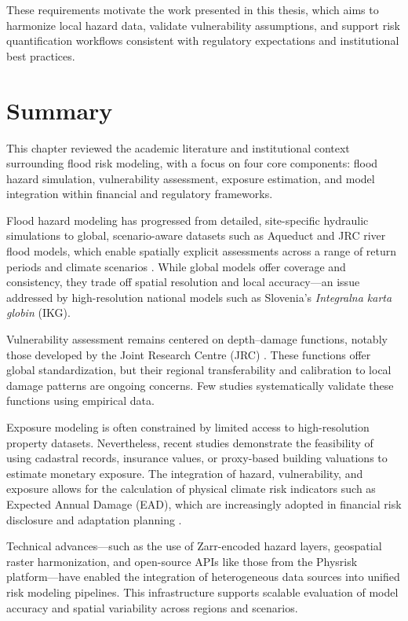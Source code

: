 These requirements motivate the work presented in this thesis, which aims to harmonize local hazard data, validate vulnerability assumptions, and support risk quantification workflows consistent with regulatory expectations and institutional best practices.

\section{Summary}

This chapter reviewed the academic literature and institutional context surrounding flood risk modeling, with a focus on four core components: flood hazard simulation, vulnerability assessment, exposure estimation, and model integration within financial and regulatory frameworks.

Flood hazard modeling has progressed from detailed, site-specific hydraulic simulations to global, scenario-aware datasets such as Aqueduct and JRC river flood models, which enable spatially explicit assessments across a range of return periods and climate scenarios \cite{ward_assessing_2013, ward_aqueduct_2020, baugh_river_2024}. While global models offer coverage and consistency, they trade off spatial resolution and local accuracy—an issue addressed by high-resolution national models such as Slovenia's \textit{Integralna karta globin} (IKG).

Vulnerability assessment remains centered on depth--damage functions, notably those developed by the Joint Research Centre (JRC) \cite{huizinga_global_2017}. These functions offer global standardization, but their regional transferability and calibration to local damage patterns are ongoing concerns. Few studies systematically validate these functions using empirical data.

Exposure modeling is often constrained by limited access to high-resolution property datasets. Nevertheless, recent studies demonstrate the feasibility of using cadastral records, insurance values, or proxy-based building valuations to estimate monetary exposure. The integration of hazard, vulnerability, and exposure allows for the calculation of physical climate risk indicators such as Expected Annual Damage (EAD), which are increasingly adopted in financial risk disclosure and adaptation planning \cite{woetzel2020climate, bressan_asset-level_2024}.

Technical advances—such as the use of Zarr-encoded hazard layers, geospatial raster harmonization, and open-source APIs like those from the Physrisk platform—have enabled the integration of heterogeneous data sources into unified risk modeling pipelines. This infrastructure supports scalable evaluation of model accuracy and spatial variability across regions and scenarios.

